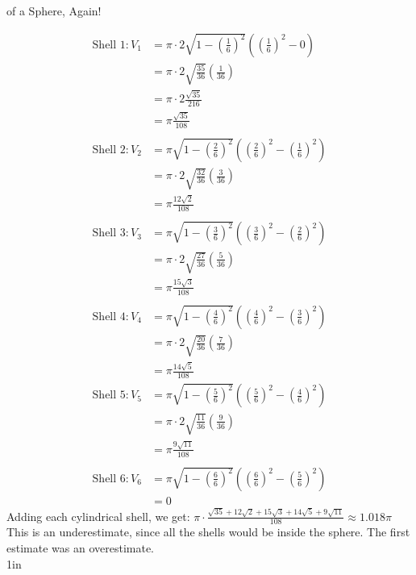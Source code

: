 \begin{exercise}{ of a Sphere, Again! \Coffeecup \Coffeecup}
\begin{itemize}
{\begin{align*}
	\text{Shell } 1:V_1&=\pi\cdot2\sqrt{1-\left(\frac{1}{6}\right)^2}\left(\left(\frac{1}{6}\right)^2-0\right)\\
	&=\pi\cdot2\sqrt{\frac{35}{36}}\left(\frac{1}{36}\right)\\
	&=\pi\cdot2\frac{\sqrt{35}}{216}\\
	&=\pi\frac{\sqrt{35}}{108}\\
	\\
	\text{Shell } 2:V_2&=\pi\sqrt{1-\left(\frac{2}{6}\right)^2}\left(\left(\frac{2}{6}\right)^2-\left(\frac{1}{6}\right)^2\right)\\
	&=\pi\cdot2\sqrt{\frac{32}{36}}\left(\frac{3}{36}\right)\\
	&=\pi\frac{12\sqrt{2}}{108}\\
	\\
	\text{Shell } 3:V_3&=\pi\sqrt{1-\left(\frac{3}{6}\right)^2}\left(\left(\frac{3}{6}\right)^2-\left(\frac{2}{6}\right)^2\right)\\
	&=\pi\cdot2\sqrt{\frac{27}{36}}\left(\frac{5}{36}\right)\\
	&=\pi\frac{15\sqrt{3}}{108}\\
	\\
	\text{Shell } 4:V_4&=\pi\sqrt{1-\left(\frac{4}{6}\right)^2}\left(\left(\frac{4}{6}\right)^2-\left(\frac{3}{6}\right)^2\right)\\
	&=\pi\cdot2\sqrt{\frac{20}{36}}\left(\frac{7}{36}\right)\\
	&=\pi\frac{14\sqrt{5}}{108}
	\\
	\text{Shell } 5:V_5&=\pi\sqrt{1-\left(\frac{5}{6}\right)^2}\left(\left(\frac{5}{6}\right)^2-\left(\frac{4}{6}\right)^2\right)\\
	&=\pi\cdot2\sqrt{\frac{11}{36}}\left(\frac{9}{36}\right)\\
	&=\pi\frac{9\sqrt{11}}{108}\\
	\\
	\text{Shell } 6:V_6&=\pi\sqrt{1-\left(\frac{6}{6}\right)^2}\left(\left(\frac{6}{6}\right)^2-\left(\frac{5}{6}\right)^2\right)\\
	&=0
\end{align*}
Adding each cylindrical shell, we get:	
	$\pi\cdot \frac{\sqrt{35} + 12 \sqrt{2} + 15 \sqrt{3} + 14 \sqrt{5} + 9 \sqrt{11}}{108}\approx 1.018\pi$
	This is an underestimate, since all the shells would be inside the sphere. The first estimate was an overestimate.\\
}{1in}

\end{itemize}

\end{exercise}

